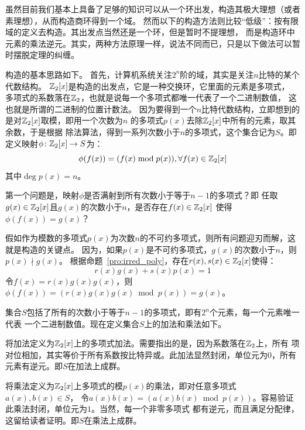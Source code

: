 虽然目前我们基本上具备了足够的知识可以从一个环出发，构造其极大理想（或者素理想），从而构造商环得到一个域。
然而以下的构造方法则比较“低级”：按有限域的定义去构造。其出发点当然还是一个环，但是暂时不提理想，
而是构造环中元素的乘法逆元。其实，两种方法原理一样，说法不同而已，只是以下做法可以暂时摆脱定理的纠缠。

构造的基本思路如下。
首先，计算机系统关注$2^n$阶的域，其实是关注$n$比特的某个代数结构。
${\mathbb Z}_2\lbrack x \rbrack$是构造的出发点，它是一种交换环，它里面的元素是多项式，
多项式的系数落在${\mathbb Z}_2$，也就是说每一个多项式都唯一代表了一个二进制数值，
这也就是所谓的二进制的位置计数法。
因为要得到一个$n$比特代数结构，立即想到的是对${\mathbb Z}_2\lbrack x \rbrack$取模，即用一个次数为$n$
的多项式$p(x)$去除${\mathbb Z}_2\lbrack x \rbrack$中所有的元素，取其余数，于是根据
除法算法，得到一系列次数小于$n$的多项式，这个集合记为$S$。即
定义映射$\phi\colon {\mathbb Z}_2\lbrack x \rbrack \to S$为：
\[ \phi(f(x)) = (f(x) \bmod p(x)), \forall f(x) \in {\mathbb Z}_2\lbrack x \rbrack \]
其中$\deg p(x) = n$。

第一个问题是，映射$\phi$是否满射到所有次数小于等于$n-1$的多项式？即
任取$g(x) \in {\mathbb Z}_2\lbrack x \rbrack $且$g(x)$的次数小于$n$，是否存在$f(x) \in {\mathbb Z}_2\lbrack x \rbrack $ 使得
$\phi(f(x)) = g(x)$？
 
 假如作为模数的多项式$p(x)$为次数$n$的不可约多项式，则所有问题迎刃而解，这就是构造的关键点。
 因为，如果$p(x)$是不可约多项式，$g(x)$的次数小于$n$，则$p(x) \nmid g(x)$。
 根据命题~\ref{pro:irred_poly}，存在$r(x), s(x) \in {\mathbb Z}_2\lbrack x \rbrack$使得：
 \[  r(x) g(x) + s(x)p(x) =1\]
 令$f(x) = r(x) g(x) g(x)$，则$\phi(f(x)) =(r(x) g(x) g(x) \bmod p(x)) = g(x)$。
 
 集合$S$包括了所有的次数小于等于$n-1$的多项式，即有$2^n$个元素，每一个元素唯一代表
 一个二进制数值。现在定义集合$S$上的加法和乘法如下。
 
将加法定义为${\mathbb Z}_2\lbrack x \rbrack$上的多项式加法。需要指出的是，因为系数落在${\mathbb Z}_2$上，所有
 项对位相加，其实等价于所有系数按比特异或。此加法显然封闭，单位元为$0$，所有元素有逆元。即$S$在加法上成群。
 
 将乘法定义为${\mathbb Z}_2\lbrack x \rbrack$上多项式的模$p(x)$的乘法，即对任意多项式$a(x), b(x) \in S$，
 令$a(x) b(x) = ( a(x) b(x) \bmod p(x))$。容易验证此乘法封闭，单位元为$1$。当然，每一个非零多项式
 都有逆元，而且满足分配律，这留给读者证明。即$S$在乘法上成群。
 
